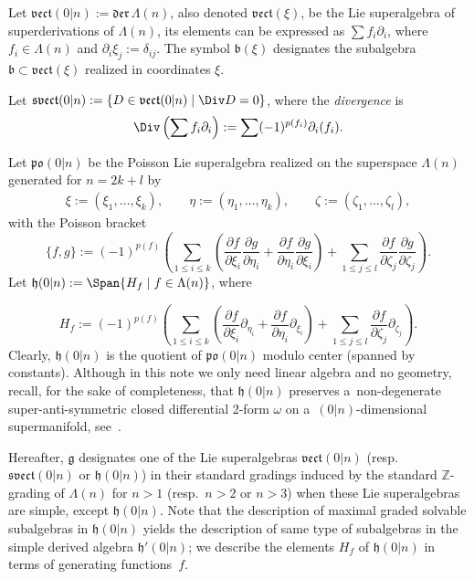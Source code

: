 \documentclass[10pt,a4paper]{amsart}
\newcommand{\del}{\partial}
\newcommand {\Zee} {{\mathbb Z}}
\newcommand {\fb} {{\mathfrak{b}}}
\newcommand {\fder} {{\mathfrak{der}}} %
\newcommand {\fg} {{\mathfrak{g}}} %
\newcommand {\fh} {{\mathfrak{h}}}
\newcommand {\fpo} {{\mathfrak{po}}}
\newcommand {\fsvect} {{\mathfrak{svect}}}
\newcommand {\fvect} {{\mathfrak{vect}}} %
\newcommand {\<} [2] {{\left.\vphantom{#2}\right.^{#1\!}\!{#2}}}
\numberwithin{equation}{section}
\begin{document}
Let $\fvect(0|n):=\fder\, \Lambda(n)$, also denoted $\fvect(\xi)$, be the Lie superalgebra of superderivations of $ \Lambda(n)$, its elements can be expressed as $\sum f_i\del_i$, where $f_i\in\Lambda(n)$ and $\del_i\xi_j:=\delta_{ij}$. The symbol $\fb(\xi)$
designates the subalgebra $\fb\subset \fvect(\xi)$ realized in coordinates $\xi$.

Let $\fsvect(0|n):=\{D\in\fvect(0|n)\mid \Div D=0\}$, where the \textit{divergence} is
\[
\Div \left(\sum f_i\del_i\right):=\sum (-1)^{p(f_i)}\del_i(f_i).
\]

Let $\fpo(0|n)$ be the Poisson Lie superalgebra realized on the superspace $\Lambda(n)$ generated for $n=2k+l$ by
\begin{gather}\label{indH}
\xi:=(\xi_1, \dots, \xi_k), \qquad \eta:=(\eta_1, \dots, \eta_k), \qquad \zeta:=(\zeta_1, \dots, \zeta_l),
\end{gather}
with the Poisson bracket
\[
\{f, g\}:=(-1)^{p(f)}\left(\sum_{1\leq i\leq k}\left(\frac{\del f}{\del \xi_i}\frac{\del g}{\del {\eta_i}} +\frac{\del f}{\del \eta_i}\frac{\del g}{\del {\xi_i}}\right)+\sum_{1\leq j\leq l}\frac{\del f}{\del \zeta_j}\frac{\del g}{\del {\zeta_j}}\right).
\]
Let $\fh(0|n):=\Span\{H_f\mid f\in\Lambda(n)\}$, where{\samepage
\[
H_f:=(-1)^{p(f)}\left(\sum_{1\leq i\leq k}\left(\frac{\del f}{\del \xi_i}\del_{\eta_i} +\frac{\del f}{\del \eta_i}\del_ {\xi_i}\right)+\sum_{1\leq j\leq l}\frac{\del f}{\del \zeta_j}\del_ {\zeta_j}\right).
\]
Clearly, $\fh(0|n)$ is the quotient of $\fpo(0|n)$ modulo center (spanned by constants). Although in this note we only need linear algebra and no geometry, recall, for the sake of completeness, that $\fh(0|n)$ preserves a~non-degenerate super-anti-symmetric closed differential 2-form $\omega$ on a~$(0|n)$-dimensional supermanifold, see~\cite{Lo}.

}

Hereafter, $\fg$ designates one of the Lie superalgebras $\fvect(0|n)$ (resp.\ $\fsvect(0|n)$ or $\fh(0|n)$) in their standard gradings induced by the standard $\Zee$-grading of $\Lambda(n)$ for $n>1$ (resp.\ $n>2$ or $n>3$) when these Lie superalgebras are simple, except $\fh(0|n)$.
Note that the description of maximal graded solvable subalgebras in $\fh(0|n)$ yields the description of same type of subalgebras in the simple derived algebra $\fh'(0|n)$; we describe the elements $H_f$ of $\fh(0|n)$ in terms of generating functions~$f$.
\end{document}
